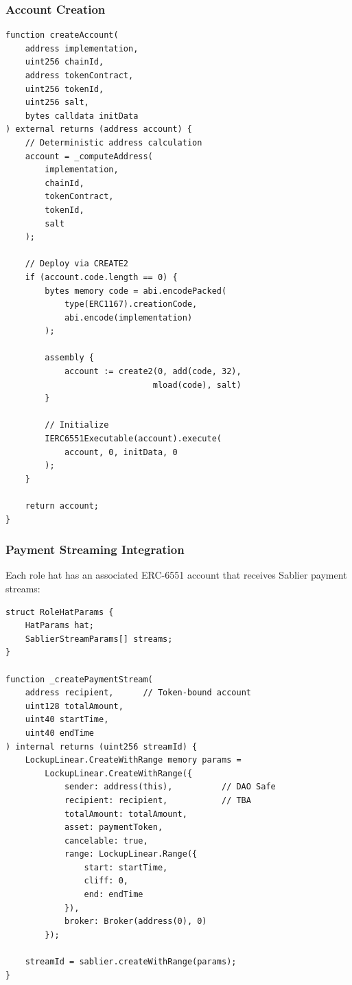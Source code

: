 \subsubsection{Account Creation}

\begin{lstlisting}[caption=Token-Bound Account Creation]
function createAccount(
    address implementation,
    uint256 chainId,
    address tokenContract,
    uint256 tokenId,
    uint256 salt,
    bytes calldata initData
) external returns (address account) {
    // Deterministic address calculation
    account = _computeAddress(
        implementation,
        chainId,
        tokenContract,
        tokenId,
        salt
    );

    // Deploy via CREATE2
    if (account.code.length == 0) {
        bytes memory code = abi.encodePacked(
            type(ERC1167).creationCode,
            abi.encode(implementation)
        );

        assembly {
            account := create2(0, add(code, 32),
                              mload(code), salt)
        }

        // Initialize
        IERC6551Executable(account).execute(
            account, 0, initData, 0
        );
    }

    return account;
}
\end{lstlisting}

\subsubsection{Payment Streaming Integration}

Each role hat has an associated ERC-6551 account that receives Sablier payment streams:

\begin{lstlisting}[caption=Role with Payment Stream]
struct RoleHatParams {
    HatParams hat;
    SablierStreamParams[] streams;
}

function _createPaymentStream(
    address recipient,      // Token-bound account
    uint128 totalAmount,
    uint40 startTime,
    uint40 endTime
) internal returns (uint256 streamId) {
    LockupLinear.CreateWithRange memory params =
        LockupLinear.CreateWithRange({
            sender: address(this),          // DAO Safe
            recipient: recipient,           // TBA
            totalAmount: totalAmount,
            asset: paymentToken,
            cancelable: true,
            range: LockupLinear.Range({
                start: startTime,
                cliff: 0,
                end: endTime
            }),
            broker: Broker(address(0), 0)
        });

    streamId = sablier.createWithRange(params);
}
\end{lstlisting}

